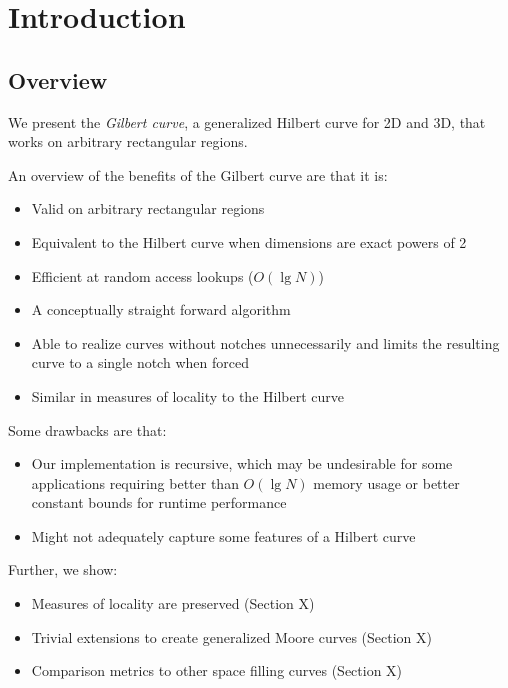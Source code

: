 \section{Introduction}

\subsection{Overview}

We present the \textit{Gilbert curve}, a generalized Hilbert curve for 2D and 3D,
that works on arbitrary rectangular regions.

An overview of the benefits of the Gilbert curve are that it is:

\begin{itemize}
  \item Valid on arbitrary rectangular regions
  \item Equivalent to the Hilbert curve when dimensions are exact powers of 2
  \item Efficient at random access lookups ($O(\lg N)$)
  \item A conceptually straight forward algorithm
  \item Able to realize curves without notches unnecessarily and limits the resulting curve
        to a single notch when forced
  \item Similar in measures of locality to the Hilbert curve
\end{itemize}

Some drawbacks are that:

\begin{itemize}
  \item Our implementation is recursive,
        which may be undesirable for some applications requiring better than $O( \lg N)$
        memory usage or better constant bounds for runtime performance
  \item Might not adequately capture some features of a Hilbert curve
\end{itemize}

Further, we show:

\begin{itemize}
  \item Measures of locality are preserved (Section X)
  \item Trivial extensions to create generalized Moore curves (Section X)
  \item Comparison metrics to other space filling curves (Section X)
\end{itemize}


